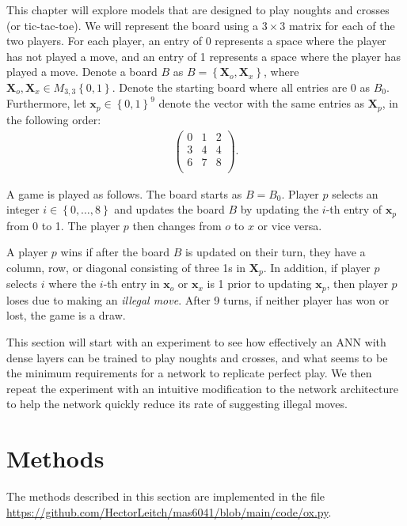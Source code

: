 \documentclass{somasmsc}
\begin{document}
This chapter will explore models that are designed to play noughts and crosses (or tic-tac-toe). We will represent the board using a $3 \times 3$ matrix for each of the two players. For each player, an entry of 0 represents a space where the player has not played a move, and an entry of 1 represents a space where the player has played a move. Denote a board $B$ as $B = \left\{\mathbf{X}_o, \mathbf{X}_x\right\}$, where $\mathbf{X}_o, \mathbf{X}_x \in M_{3,3}\left\{0,1\right\}$. Denote the starting board where all entries are 0 as $B_0$. Furthermore, let $\pmb{x}_p \in \left\{0,1\right\}^9$ denote the vector with the same entries as $\mathbf{X}_p$, in the following order:
\begin{align*}
    \begin{pmatrix}
        0 & 1 & 2 \\
        3 & 4 & 4 \\
        6 & 7 & 8 \\
    \end{pmatrix}.
\end{align*}

A game is played as follows. The board starts as $B = B_0$. Player $p$ selects an integer $i \in \left\{0, \dots, 8\right\}$ and updates the board $B$ by updating the $i$-th entry of $\pmb{x}_p$ from 0 to 1. The player $p$ then changes from $o$ to $x$ or vice versa.

A player $p$ wins if after the board $B$ is updated on their turn, they have a column, row, or diagonal consisting of three 1s in $\mathbf{X}_p$. In addition, if player $p$ selects $i$ where the $i$-th entry in $\pmb{x}_o$ or $\pmb{x}_x$ is 1 prior to updating $\pmb{x}_p$, then player $p$ loses due to making an \textit{illegal move}. After 9 turns, if neither player has won or lost, the game is a draw.

This section will start with an experiment to see how effectively an ANN with dense layers can be trained to play noughts and crosses, and what seems to be the minimum requirements for a network to replicate perfect play. We then repeat the experiment with an intuitive modification to the network architecture to help the network quickly reduce its rate of suggesting illegal moves.

\section{Methods}

The methods described in this section are implemented in the file \url{https://github.com/HectorLeitch/mas6041/blob/main/code/ox.py}.
\end{document}

